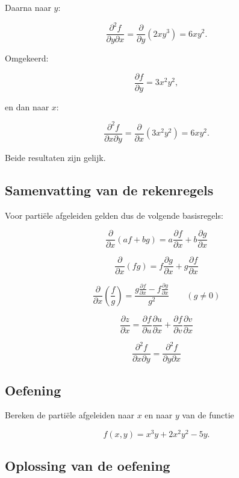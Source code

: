 \documentclass[11pt,a4paper]{article}
\begin{document}
    Daarna naar $y$:

    \[
        \frac{\partial^2 f}{\partial y \partial x}
        =
        \frac{\partial}{\partial y}(2xy^3)
        =
        6xy^2.
    \]

    Omgekeerd:

    \[
        \frac{\partial f}{\partial y}=3x^2y^2,
    \]

    en dan naar $x$:

    \[
        \frac{\partial^2 f}{\partial x \partial y}
        =
        \frac{\partial}{\partial x}(3x^2y^2)
        =
        6xy^2.
    \]

    Beide resultaten zijn gelijk.

    \subsection{Samenvatting van de rekenregels}

    Voor partiële afgeleiden gelden dus de volgende basisregels:

    \[
        \frac{\partial}{\partial x}(af+bg)
        =
        a\frac{\partial f}{\partial x}
        +
        b\frac{\partial g}{\partial x}
    \]

    \[
        \frac{\partial}{\partial x}(fg)
        =
        f\frac{\partial g}{\partial x}
        +
        g\frac{\partial f}{\partial x}
    \]

    \[
        \frac{\partial}{\partial x}\left(\frac{f}{g}\right)
        =
        \frac{
            g\frac{\partial f}{\partial x}
            -
            f\frac{\partial g}{\partial x}
        }{g^2}
        \qquad (g\neq 0)
    \]

    \[
        \frac{\partial z}{\partial x}
        =
        \frac{\partial f}{\partial u}\frac{\partial u}{\partial x}
        +
        \frac{\partial f}{\partial v}\frac{\partial v}{\partial x}
    \]

    \[
        \frac{\partial^2 f}{\partial x \partial y}
        =
        \frac{\partial^2 f}{\partial y \partial x}
    \]

    \subsection{Oefening}

    Bereken de partiële afgeleiden naar $x$ en naar $y$ van de functie

    \[
        f(x,y)=x^3y + 2x^2y^2 - 5y.
    \]

    \subsection{Oplossing van de oefening}
\end{document}
